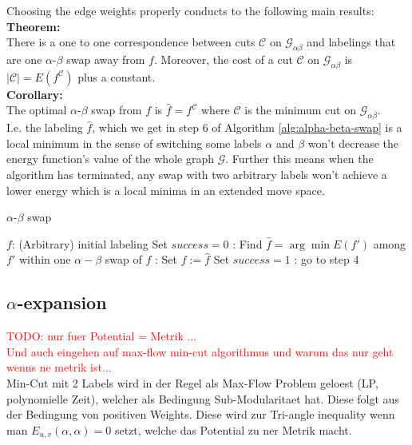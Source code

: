 \documentclass{scrartcl}[12pt, halfparskip]
\newcommand{\todo}[1]{\textcolor{red}{TODO: #1}}
\begin{document}
Choosing the edge weights properly conducts to the following main results: \\

\textbf{Theorem:}\\
There is a one to one correspondence between cuts $\mathcal{C}$ on $\mathcal{G}_{\alpha \beta}$ and labelings that are one $\alpha$-$\beta$ swap away from $f$. Moreover, the cost of a cut $\mathcal{C}$ on $\mathcal{G}_{\alpha \beta}$ is $|\mathcal{C}| = E(f^\mathcal{C})$ plus a constant. \\

\textbf{Corollary:}\\
The optimal $\alpha$-$\beta$ swap from $f$ is $\hat{f} = f^\mathcal{C}$ where $\mathcal{C}$ is the minimum cut on $\mathcal{G}_{\alpha \beta}$. \\


I.e. the labeling $\hat{f}$, which we get in step 6 of Algorithm \ref{alg:alpha-beta-swap} is a local minimum in the sense of switching some labels $\alpha$ and $\beta$ won't decrease the energy function's value of the whole graph $\mathcal{G}$. Further this means when the algorithm has terminated, any swap with two arbitrary labels won't achieve a lower energy which is a local minima in an extended move space.



\begin{algorithm}[H]
\caption{$\alpha$-$\beta$ swap}\label{alg:alpha-beta-swap}
\begin{algorithmic}[1]
	\State $f$: (Arbitrary) initial labeling 
	\State
	\State Set $success = 0$
	:
		\State Find $\hat{f} = \arg \min E(f')$ among $f'$ within one $\alpha-\beta$ swap of $f$
		:
			\State Set $f := \hat{f}$
			\State Set $success = 1$
		\EndIf
	\EndFor
	:
		\State go to step 4
	\EndIf
	\State
	\State {}
\EndProcedure
\end{algorithmic}
\end{algorithm}








\subsection{$\alpha$-expansion}

\todo{nur fuer Potential = Metrik ...\\ Und auch eingehen auf max-flow min-cut algorithmus und warum das nur geht wenns ne metrik ist...} \\
Min-Cut mit 2 Labels wird in der Regel als Max-Flow Problem geloest (LP, polynomielle Zeit), welcher als Bedingung Sub-Modularitaet hat. Diese folgt aus der Bedingung von positiven Weights. Diese wird zur Tri-angle inequality wenn man $E_{u,v}(\alpha, \alpha)=0$ setzt, welche das Potential zu ner Metrik macht.
\end{document}
